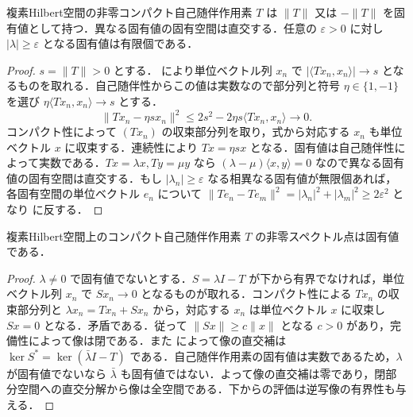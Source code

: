 \begin{prop}[コンパクト自己随伴作用素の非零固有値]
複素Hilbert空間の非零コンパクト自己随伴作用素 $T$ は $\|T\|$ 又は $-\|T\|$ を固有値として持つ．異なる固有値の固有空間は直交する．任意の $\varepsilon>0$ に対し $|\lambda|\geq\varepsilon$ となる固有値は有限個である．
\end{prop}
\begin{proof}
$s=\|T\|>0$ とする． により単位ベクトル列 $x_n$ で $|\langle Tx_n,x_n\rangle|\to s$ となるものを取れる．自己随伴性からこの値は実数なので部分列と符号 $\eta\in\{1,-1\}$ を選び $\eta\langle Tx_n,x_n\rangle\to s$ とする．
\[
\|Tx_n-\eta s x_n\|^2
\leq2s^2-2\eta s\langle Tx_n,x_n\rangle\to0 .
\]
コンパクト性によって $(Tx_n)$ の収束部分列を取り，式から対応する $x_n$ も単位ベクトル $x$ に収束する．連続性により $Tx=\eta s x$ となる．固有値は自己随伴性によって実数である．$Tx=\lambda x,Ty=\mu y$ なら $(\lambda-\mu)\langle x,y\rangle=0$ なので異なる固有値の固有空間は直交する．もし $|\lambda_n|\geq\varepsilon$ なる相異なる固有値が無限個あれば，各固有空間の単位ベクトル $e_n$ について $\|Te_n-Te_m\|^2=|\lambda_n|^2+|\lambda_m|^2\geq2\varepsilon^2$ となり  に反する．
\end{proof}
\begin{prop}[コンパクト自己随伴作用素の非零スペクトル]
複素Hilbert空間上のコンパクト自己随伴作用素 $T$ の非零スペクトル点は固有値である．
\end{prop}
\begin{proof}
$\lambda\ne0$ で固有値でないとする．$S=\lambda I-T$ が下から有界でなければ，単位ベクトル列 $x_n$ で $Sx_n\to0$ となるものが取れる．コンパクト性による $Tx_n$ の収束部分列と $\lambda x_n=Tx_n+Sx_n$ から，対応する $x_n$ は単位ベクトル $x$ に収束し $Sx=0$ となる．矛盾である．従って $\|Sx\|\geq c\|x\|$ となる $c>0$ があり，完備性によって像は閉である．また  によって像の直交補は $\ker S^*=\ker(\bar\lambda I-T)$ である．自己随伴作用素の固有値は実数であるため，$\lambda$ が固有値でないなら $\bar\lambda$ も固有値ではない．よって像の直交補は零であり，閉部分空間への直交分解から像は全空間である．下からの評価は逆写像の有界性も与える．
\end{proof}
